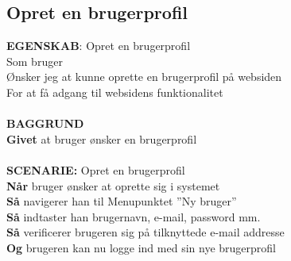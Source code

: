 \subsection{Opret en brugerprofil}
{\color{blue}\textbf{EGENSKAB}:} Opret en brugerprofil \\
Som bruger \\
Ønsker jeg at kunne oprette en brugerprofil på websiden \\
For at få adgang til websidens funktionalitet\\ \\
{\color{blue}\textbf{BAGGRUND}} \\
{\color{blue}\textbf{Givet}} at bruger ønsker en brugerprofil \\\\
{\color{blue}\textbf{SCENARIE:}} Opret en brugerprofil \\
{\color{blue}\textbf{Når}} bruger ønsker at oprette sig i systemet \\
{\color{blue}\textbf{Så}} navigerer han til Menupunktet ”Ny bruger” \\
{\color{blue}\textbf{Så}} indtaster han brugernavn, e-mail, password mm.\\
{\color{blue}\textbf{Så}} verificerer brugeren sig på tilknyttede e-mail addresse\\
{\color{blue}\textbf{Og}} brugeren kan nu logge ind med sin nye brugerprofil